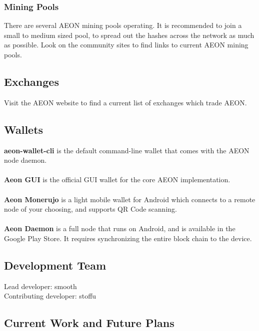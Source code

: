 \subsubsection{Mining Pools}
There are several AEON mining pools operating. It is recommended to join a small to medium sized pool, to spread out the hashes across the network as much as possible.  Look on the community sites to find links to current AEON mining pools.

\subsection{Exchanges}
Visit the AEON website to find a current list of exchanges which trade AEON.

\subsection{Wallets}
\textbf{aeon-wallet-cli} is the default command-line wallet that comes with the AEON node daemon.\\
\\
\textbf{Aeon GUI} is the official GUI wallet for the core AEON implementation.\\
\\
\textbf{Aeon Monerujo} is a light mobile wallet for Android which connects to a remote node of your choosing, and supports QR Code scanning.\\
\\
\textbf{Aeon Daemon} is a full node that runs on Android, and is available in the Google Play Store. It requires synchronizing the entire block chain to the device.

\subsection{Development Team}
Lead developer:		smooth\\
Contributing developer:	stoffu

\subsection{Current Work and Future Plans}
